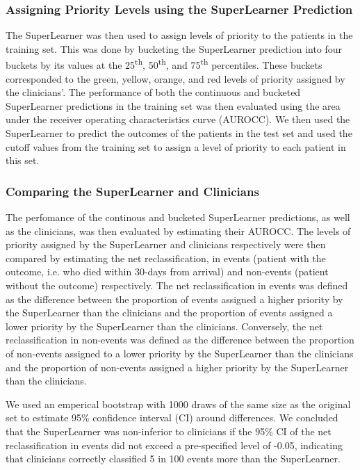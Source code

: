 \documentclass[10pt,letterpaper]{article}\usepackage[]{graphicx}\usepackage[]{color}
\begin{document}
\subsubsection*{Assigning Priority Levels using the SuperLearner Prediction}
The SuperLearner was then used to assign levels of priority to the patients in
the training set. This was done by bucketing the SuperLearner prediction into
four buckets by its values at the 25\textsuperscript{th},
50\textsuperscript{th}, and 75\textsuperscript{th} percentiles. These buckets
corresponded to the green, yellow, orange, and red levels of priority assigned
by the clinicians'. The performance of both the continuous and bucketed
SuperLearner predictions in the training set was then evaluated using the area
under the receiver operating characteristics curve (AUROCC). We then used the
SuperLearner to predict the outcomes of the patients in the test set and used
the cutoff values from the training set to assign a level of priority to each
patient in this set.

\subsubsection*{Comparing the SuperLearner and Clinicians}
The perfomance of the continous and bucketed SuperLearner predictions, as well
as the clinicians, was then evaluated by estimating their AUROCC. The levels of
priority assigned by the SuperLearner and clinicians respectively were then
compared by estimating the net reclassification, in events (patient with the
outcome, i.e. who died within 30-days from arrival) and non-events (patient
without the outcome) respectively. The net reclassification in events was
defined as the difference between the proportion of events assigned a higher
priority by the SuperLearner than the clinicians and the proportion of events
assigned a lower priority by the SuperLearner than the clinicians. Conversely,
the net reclassification in non-events was defined as the difference between the
proportion of non-events assigned to a lower priority by the SuperLearner than
the clinicians and the proportion of non-events assigned a higher priority by
the SuperLearner than the clinicians.

We used an emperical bootstrap with 1000 draws of the same size as the original
set to estimate 95\% confidence interval (CI) around differences. We concluded
that the SuperLearner was non-inferior to clinicians if the 95\% CI of the net
reclassification in events did not exceed a pre-specified level of -0.05,
indicating that clinicians correctly classified 5 in 100 events more than the
SuperLearner.
\end{document}

